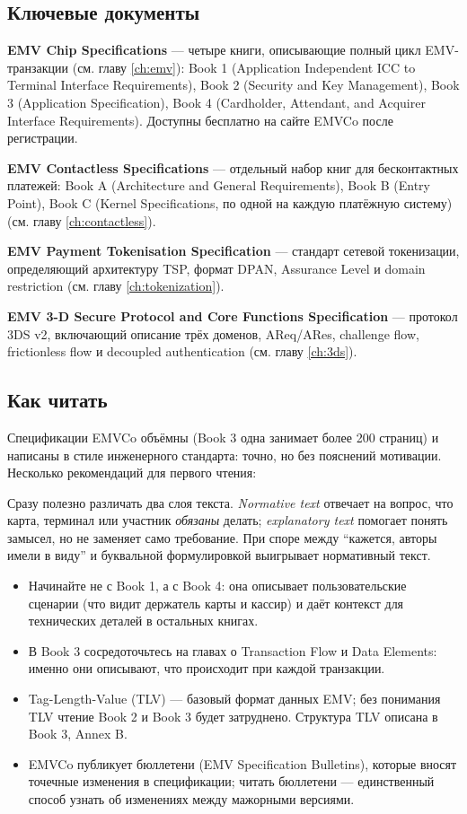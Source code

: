 \subsection*{Ключевые документы}

\textbf{EMV Chip Specifications} — четыре книги, описывающие
полный цикл EMV-транзакции (см. главу \ref{ch:emv}):
Book 1 (Application Independent ICC to Terminal Interface
Requirements), Book 2 (Security and Key Management),
Book 3 (Application Specification), Book 4 (Cardholder,
Attendant, and Acquirer Interface Requirements). Доступны
бесплатно на сайте EMVCo после регистрации.

\textbf{EMV Contactless Specifications} — отдельный набор
книг для бесконтактных платежей: Book A (Architecture and
General Requirements), Book B (Entry Point), Book C
(Kernel Specifications, по одной на каждую платёжную
систему) (см. главу \ref{ch:contactless}).

\textbf{EMV Payment Tokenisation Specification} — стандарт
сетевой токенизации, определяющий архитектуру TSP, формат
DPAN, Assurance Level и domain
restriction (см. главу \ref{ch:tokenization}).

\textbf{EMV 3-D Secure Protocol and Core Functions
  Specification} — протокол 3DS v2, включающий описание
трёх доменов, AReq/ARes, challenge flow, frictionless flow
и decoupled authentication (см. главу \ref{ch:3ds}).

\subsection*{Как читать}

Спецификации EMVCo объёмны (Book 3 одна занимает более 200 страниц)
и написаны в стиле инженерного стандарта: точно, но без пояснений
мотивации. Несколько рекомендаций для первого чтения:

Сразу полезно различать два слоя текста. \emph{Normative text}
отвечает на вопрос, что карта, терминал или участник \emph{обязаны}
делать; \emph{explanatory text} помогает понять замысел, но не заменяет
само требование. При споре между \enquote{кажется, авторы имели в виду}
и буквальной формулировкой выигрывает нормативный текст.

\begin{itemize}
  \item Начинайте не с Book 1, а с Book 4: она описывает
        пользовательские сценарии (что видит держатель карты
        и кассир) и даёт контекст для технических деталей
        в остальных книгах.
  \item В Book 3 сосредоточьтесь на главах о Transaction Flow
        и Data Elements: именно они описывают, что происходит
        при каждой транзакции.
  \item Tag-Length-Value (TLV) — базовый формат данных EMV; без понимания TLV чтение Book 2 и Book 3 будет затруднено.
        Структура TLV описана в Book 3, Annex B.
  \item EMVCo публикует бюллетени (EMV Specification Bulletins), которые вносят точечные изменения в спецификации; читать
        бюллетени — единственный способ узнать об изменениях между мажорными версиями.
\end{itemize}

